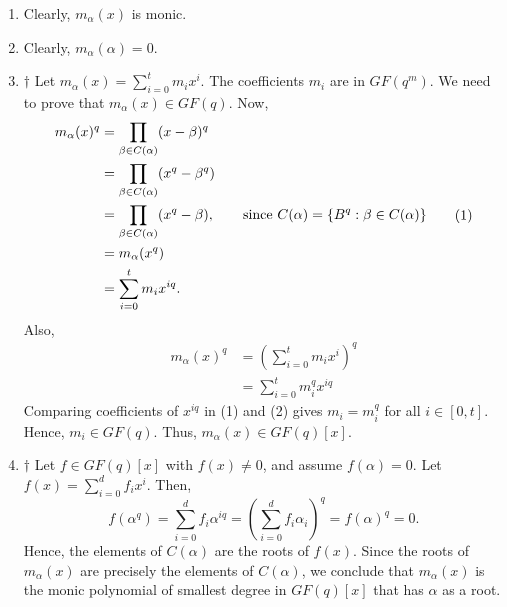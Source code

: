 \begin{Proof}{}{} \;
    \begin{enumerate}[label=(\roman*)]
        \item Clearly, $ m_\alpha(x) $ is monic.
        \item Clearly, $ m_\alpha(\alpha)=0 $.
        \item $ \dagger $ Let $ m_\alpha(x)=\sum\limits_{i=0}^{t} m_i x^i $.
              The coefficients $ m_i $ are in $ GF(q^m) $. We need to prove that
              $ m_\alpha(x)\in GF(q) $. Now,
              \begin{equation}
                  \begin{aligned}
                      m_\alpha(x)^q
                       & =\prod_{\beta\in C(\alpha)}(x-\beta)^q                                                            \\
                       & =\prod_{\beta\in C(\alpha)}(x^q-\beta^q)                                                          \\
                       & =\prod_{\beta\in C(\alpha)}(x^q-\beta),\qquad \text{since }C(\alpha)=\{B^q:\beta\in C(\alpha)\} \\
                       & =m_\alpha(x^q)                                                                                    \\
                       & =\sum\limits_{i=0}^{t} m_i x^{iq}.
                  \end{aligned}\tag{1}
              \end{equation}
              Also,
              \begin{equation}
                  \begin{aligned}
                      m_\alpha(x)^q
                       & =\left( \sum\limits_{i=0}^{t} m_i x^i \right)^q \\
                       & = \sum\limits_{i=0}^{t} m_i^q x^{iq}
                  \end{aligned}\tag{2}
              \end{equation}
              Comparing coefficients of $ x^{iq} $ in (1) and (2) gives $ m_i=m_i^q $
              for all $ i\in[0,t] $. Hence, $ m_i\in GF(q) $. Thus, $ m_\alpha(x)\in GF(q)[x] $.
        \item $ \dagger $ Let $ f\in GF(q)[x] $ with $ f(x)\neq 0 $, and assume $ f(\alpha)=0 $.
              Let $ f(x)=\sum\limits_{i=0}^{d} f_i x^i $. Then,
              \[ f(\alpha^q)=\sum\limits_{i=0}^{d} f_i\alpha^{iq}=
                  \left( \sum\limits_{i=0}^{d} f_i\alpha_i \right)^q=f(\alpha)^q=0. \]
              Hence, the elements of $ C(\alpha) $ are the roots of $ f(x) $. Since the roots
              of $ m_\alpha(x) $ are precisely the elements of $ C(\alpha) $, we conclude
              that $ m_\alpha(x) $ is the monic polynomial of smallest degree in $ GF(q)[x] $
              that has $ \alpha $ as a root.
    \end{enumerate}
\end{Proof}

